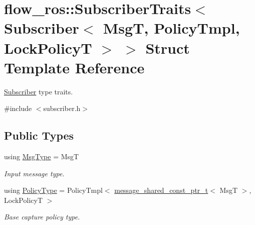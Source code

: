 \hypertarget{structflow__ros_1_1_subscriber_traits_3_01_subscriber_3_01_msg_t_00_01_policy_tmpl_00_01_lock_policy_t_01_4_01_4}{}\section{flow\+\_\+ros\+:\+:Subscriber\+Traits$<$ Subscriber$<$ MsgT, Policy\+Tmpl, Lock\+PolicyT $>$ $>$ Struct Template Reference}
\label{structflow__ros_1_1_subscriber_traits_3_01_subscriber_3_01_msg_t_00_01_policy_tmpl_00_01_lock_policy_t_01_4_01_4}


\hyperlink{classflow__ros_1_1_subscriber}{Subscriber} type traits.  




{\ttfamily \#include $<$subscriber.\+h$>$}

\subsection*{Public Types}
\begin{DoxyCompactItemize}
\item 
\mbox{\label{structflow__ros_1_1_subscriber_traits_3_01_subscriber_3_01_msg_t_00_01_policy_tmpl_00_01_lock_policy_t_01_4_01_4_adab0c086537ed432b04633406513c28a}} 
using \hyperlink{structflow__ros_1_1_subscriber_traits_3_01_subscriber_3_01_msg_t_00_01_policy_tmpl_00_01_lock_policy_t_01_4_01_4_adab0c086537ed432b04633406513c28a}{Msg\+Type} = MsgT
\begin{DoxyCompactList}\small\item\em Input message type. \end{DoxyCompactList}\item 
\mbox{\label{structflow__ros_1_1_subscriber_traits_3_01_subscriber_3_01_msg_t_00_01_policy_tmpl_00_01_lock_policy_t_01_4_01_4_aa431ca3ab1e84d5ee2c8e956635b1587}} 
using \hyperlink{structflow__ros_1_1_subscriber_traits_3_01_subscriber_3_01_msg_t_00_01_policy_tmpl_00_01_lock_policy_t_01_4_01_4_aa431ca3ab1e84d5ee2c8e956635b1587}{Policy\+Type} = Policy\+Tmpl$<$ \hyperlink{namespaceflow__ros_ad222b6c2bd0341c551129c3a03241ad7}{message\+\_\+shared\+\_\+const\+\_\+ptr\+\_\+t}$<$ MsgT $>$, Lock\+PolicyT $>$
\begin{DoxyCompactList}\small\item\em Base capture policy type. \end{DoxyCompactList}\end{DoxyCompactItemize}


